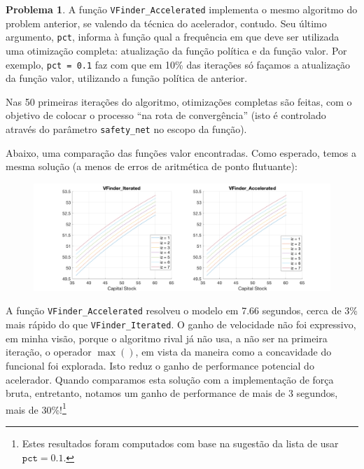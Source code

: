 \documentclass[11pt]{article}
\theoremstyle{definition}
\theoremstyle{definition}
\newtheorem{problema}{Problema}
\theoremstyle{solution}
\begin{document}
	\begin{problema}
		A função \texttt{VFinder\_Accelerated} implementa o mesmo algoritmo do problem anterior, se valendo da técnica do acelerador, contudo. Seu último argumento, \texttt{pct}, informa à função qual a frequência em que deve ser utilizada uma otimização completa: atualização da função política e da função valor. Por exemplo, \texttt{pct = 0.1} faz com que em 10\% das iterações só façamos a atualização da função valor, utilizando a função política de anterior. 
		
		Nas 50 primeiras iterações do algoritmo, otimizações completas são feitas, com o objetivo de colocar o processo ``na rota de convergência'' (isto é controlado através do parâmetro \texttt{safety\_net} no escopo da função).
		
		Abaixo, uma comparação das funções valor encontradas. Como esperado, temos a mesma solução (a menos de erros de aritmética de ponto flutuante):
		\begin{figure}[h!]
			\centering
			\includegraphics[scale = 0.2]{iterated_vs_accelerated}
		\end{figure}
		
		A função \texttt{VFinder\_Accelerated} resolveu o modelo em 7.66 segundos, cerca de 3\% mais rápido do que \texttt{VFinder\_Iterated}. O ganho de velocidade não foi expressivo, em minha visão, porque o algoritmo rival já não usa, a não ser na primeira iteração, o operador $\max()$, em vista da maneira como a concavidade do funcional foi explorada. Isto reduz o ganho de performance potencial do acelerador. Quando comparamos esta solução com a implementação de força bruta, entretanto, notamos um ganho de performance de mais de 3 segundos, mais de 30\%!\footnote{Estes resultados foram computados com base na sugestão da lista de usar $\texttt{pct}= 0.1$.}
		
		
	\end{problema}
	
\end{document}
